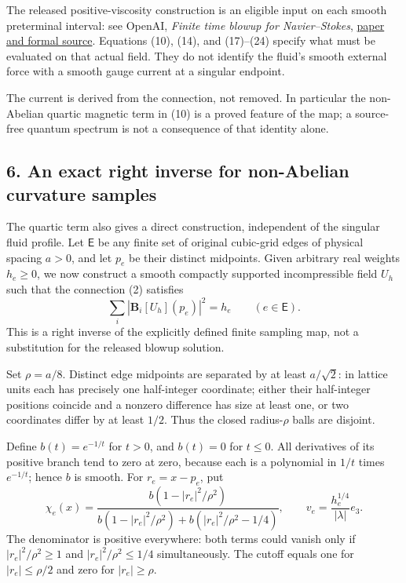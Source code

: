 \documentclass[
  11pt,
]{article}
\begin{document}
The released positive-viscosity construction is an eligible input on
each smooth preterminal interval: see OpenAI, \emph{Finite time blowup
for Navier--Stokes},
\href{https://openai.com/index/navier-stokes-solution/}{paper and formal
source}. Equations (10), (14), and (17)--(24) specify what must be
evaluated on that actual field. They do not identify the fluid's smooth
external force with a smooth gauge current at a singular endpoint.

The current is derived from the connection, not removed. In particular
the non-Abelian quartic magnetic term in (10) is a proved feature of the
map; a source-free quantum spectrum is not a consequence of that
identity alone.

\subsection{6. An exact right inverse for non-Abelian curvature
samples}\label{weak-coupling-part-18-an-exact-right-inverse-for-non-abelian-curvature-samples}

The quartic term also gives a direct construction, independent of the
singular fluid profile. Let \(\mathsf E\) be any finite set of original
cubic-grid edges of physical spacing \(a>0\), and let \(p_e\) be their
distinct midpoints. Given arbitrary real weights \(h_e\ge0\), we now
construct a smooth compactly supported incompressible field \(U_h\) such
that the connection (2) satisfies \[
 \sum_i|\mathbf B_i[U_h](p_e)|^2=h_e\qquad(e\in\mathsf E).
 \tag{25}
\] This is a right inverse of the explicitly defined finite sampling
map, not a substitution for the released blowup solution.

Set \(\rho=a/8\). Distinct edge midpoints are separated by at least
\(a/\sqrt2\): in lattice units each has precisely one half-integer
coordinate; either their half-integer positions coincide and a nonzero
difference has size at least one, or two coordinates differ by at least
\(1/2\). Thus the closed radius-\(\rho\) balls are disjoint.

Define \(b(t)=e^{-1/t}\) for \(t>0\), and \(b(t)=0\) for \(t\le0\). All
derivatives of its positive branch tend to zero at zero, because each is
a polynomial in \(1/t\) times \(e^{-1/t}\); hence \(b\) is smooth. For
\(r_e=x-p_e\), put \[
 \chi_e(x)=
 \frac{b(1-|r_e|^2/\rho^2)}
 {b(1-|r_e|^2/\rho^2)+b(|r_e|^2/\rho^2-1/4)},\qquad
 v_e=\frac{h_e^{1/4}}{|\lambda|}e_3 .
 \tag{26}
\] The denominator is positive everywhere: both terms could vanish only
if \(|r_e|^2/\rho^2\ge1\) and \(|r_e|^2/\rho^2\le1/4\) simultaneously.
The cutoff equals one for \(|r_e|\le\rho/2\) and zero for
\(|r_e|\ge\rho\).
\end{document}
